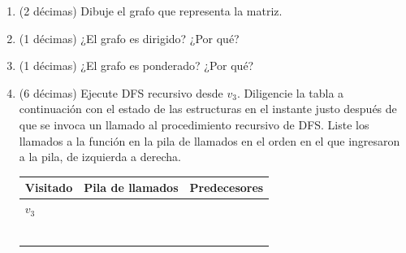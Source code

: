 
\begin{enumerate}
  \item (2 décimas) Dibuje el grafo que representa la matriz.
  \item (1 décimas) ¿El grafo es dirigido? ¿Por qué?
  \item (1 décimas) ¿El grafo es ponderado? ¿Por qué?
  \item (6 décimas) Ejecute DFS recursivo desde \(v_3\). Diligencie la tabla a continuación con el estado de las estructuras en el instante justo después de que se invoca un llamado al procedimiento recursivo de DFS. Liste los llamados a la función en la pila de llamados en el orden en el que ingresaron a la pila, de izquierda a derecha.

\begin{center}
\begin{tabularx}{\textwidth}{|>{\centering\arraybackslash}X|>{\centering\arraybackslash}X|>{\centering\arraybackslash}X|}
\hline
\textbf{Visitado} & \textbf{Pila de llamados} & \textbf{Predecesores} \\
\hline
$v_3$ \rule{0pt}{0.9cm} & & \\
\hline
\rule{0pt}{0.9cm} & & \\
\hline
\rule{0pt}{0.9cm} & & \\
\hline
\rule{0pt}{0.9cm} & & \\
\hline
\rule{0pt}{0.9cm} & & \\
\hline
\rule{0pt}{0.9cm} & & \\
\hline
\rule{0pt}{0.9cm} & & \\
\hline
\end{tabularx}
\end{center}
\end{enumerate}

\bigskip
